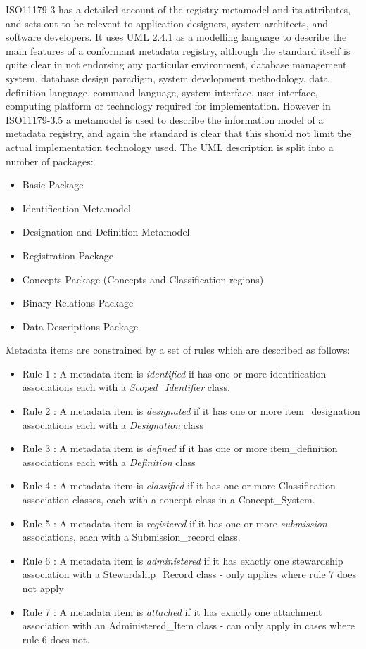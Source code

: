 \documentclass{llncs}
\begin{document}
ISO11179-3 has a detailed account of the registry metamodel and its attributes, and sets out to be relevent to application designers, system architects, and software developers. It uses UML 2.4.1 as a modelling language to describe the main features of a conformant metadata registry, although the standard itself is quite clear in not endorsing any particular environment, database management system, database design paradigm, system development methodology, data definition language, command language, system interface, user interface, computing platform or technology required for implementation. However in ISO11179-3.5 a metamodel is used to describe the information model of a metadata registry, and again the standard is clear that this should not limit the actual implementation technology used. The UML description is split into a number of packages:
\begin{itemize}
\item Basic Package
\item Identification Metamodel
\item Designation and Definition Metamodel
\item Registration Package
\item Concepts Package (Concepts and Classification regions)
\item Binary Relations Package
\item Data Descriptions Package
\end{itemize}
Metadata items are constrained by a set of rules which are described as follows:
\begin{itemize}
\item Rule 1 : A metadata item is  \emph{identified} if has one or more identification associations each with a \emph{Scoped\_Identifier} class.
\item Rule 2 : A metadata item is  \emph{designated} if it has one or more item\_designation associations each with a \emph{Designation} class
\item Rule 3 : A metadata item is \emph{defined} if it has one or more item\_definition associations each with a \emph{Definition} class
\item Rule 4 : A metadata item is \emph{classified} if it has one or more Classification association classes, each with a concept class in a Concept\_System.
\item Rule 5 : A metadata item is  \emph{registered} if it has one or more \emph{submission} associations, each with a Submission\_record class.
\item Rule 6 :  A metadata item is  \emph{administered} if it has exactly one stewardship association with a Stewardship\_Record class - only applies where rule 7 does not apply
\item Rule 7 : A metadata item is \emph{attached} if it has exactly one attachment association with an Administered\_Item class - can only apply in cases where rule 6 does not.
\end{itemize}
\end{document}
